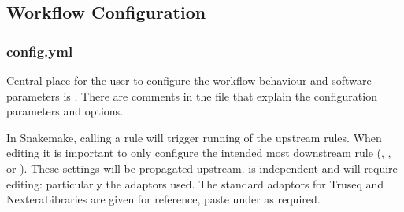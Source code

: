 \documentclass[letterpaper,10pt,english]{sphinxhowto}
\begin{document}
\begin{sphinxVerbatim}[commandchars=\\\{\}]
  
  
  
  
  
  
  
  
  
  
  
\end{sphinxVerbatim}


\subsection{Workflow Configuration}
\label{\detokenize{index:workflow-configuration}}

\subsubsection{config.yml}
\label{\detokenize{index:config-yml}}
Central place for the user to configure the workflow behaviour and software parameters is . There are comments in the file that explain the configuration parameters and options.

In Snakemake, calling a rule will trigger running of the upstream rules. When editing  it is important to only configure the intended most downstream rule (, , or ). These settings will be propagated upstream.  is independent and will require editing: particularly the  adaptors used. The standard adaptors for Truseq\sphinxhyphen{} and Nextera\sphinxhyphen{}Libraries are given for reference, paste under  as required.
\end{document}
